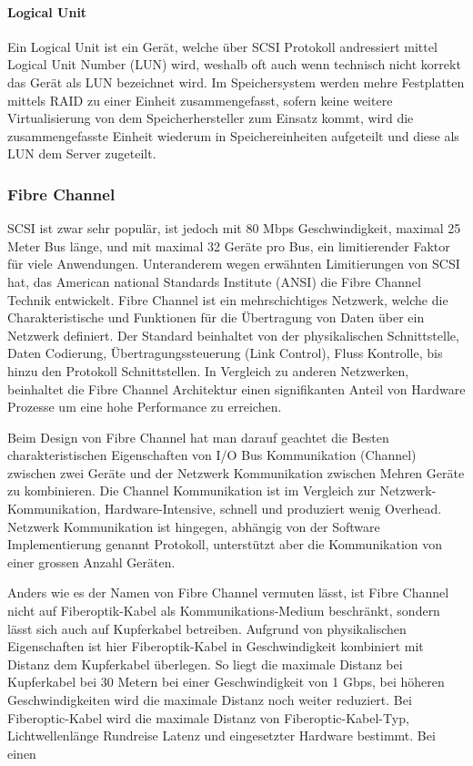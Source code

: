 \paragraph*{Logical Unit}
Ein Logical Unit ist ein Gerät, welche über SCSI Protokoll andressiert mittel Logical Unit Number (LUN) wird, weshalb oft auch wenn technisch nicht korrekt das Gerät als LUN bezeichnet wird. Im Speichersystem werden mehre Festplatten mittels RAID zu einer Einheit zusammengefasst, sofern keine weitere Virtualisierung von dem Speicherhersteller zum Einsatz kommt, wird die zusammengefasste Einheit wiederum in Speichereinheiten aufgeteilt und diese als LUN dem Server zugeteilt.\cite{SNIA2011}

\subsubsection{Fibre Channel}
SCSI ist zwar sehr populär, ist jedoch mit 80 Mbps Geschwindigkeit, maximal 25 Meter Bus länge, und mit maximal 32 Geräte pro Bus, ein limitierender Faktor für viele Anwendungen. Unteranderem wegen erwähnten Limitierungen von SCSI hat, das American national Standards Institute (ANSI) die Fibre Channel Technik entwickelt. Fibre Channel ist ein mehrschichtiges Netzwerk, welche die Charakteristische und Funktionen für die Übertragung von Daten über ein Netzwerk definiert. Der Standard beinhaltet von der physikalischen Schnittstelle, Daten Codierung, Übertragungssteuerung (Link Control), Fluss Kontrolle, bis hinzu den Protokoll Schnittstellen. In Vergleich zu anderen Netzwerken, beinhaltet die Fibre Channel Architektur einen signifikanten Anteil von Hardware Prozesse um eine hohe Performance zu erreichen.\cite{Gupta2002}\cite{Christopher2009}

Beim Design von Fibre Channel hat man darauf geachtet die Besten charakteristischen Eigenschaften von I/O Bus Kommunikation (Channel) zwischen zwei Geräte und der Netzwerk Kommunikation zwischen Mehren Geräte zu kombinieren. Die Channel Kommunikation ist im Vergleich zur Netzwerk-Kommunikation, Hardware-Intensive, schnell und produziert wenig Overhead. Netzwerk Kommunikation ist hingegen, abhängig von der Software Implementierung genannt Protokoll, unterstützt aber die Kommunikation von einer grossen Anzahl Geräten.

Anders wie es der Namen von Fibre Channel vermuten lässt, ist Fibre Channel nicht auf Fiberoptik-Kabel als Kommunikations-Medium beschränkt, sondern lässt sich auch auf Kupferkabel betreiben. Aufgrund von physikalischen Eigenschaften ist hier Fiberoptik-Kabel in Geschwindigkeit kombiniert mit Distanz dem Kupferkabel überlegen. So liegt die maximale Distanz bei Kupferkabel bei 30 Metern bei einer Geschwindigkeit von 1 Gbps, bei höheren Geschwindigkeiten wird die maximale Distanz noch weiter reduziert. Bei Fiberoptic-Kabel wird die maximale Distanz von Fiberoptic-Kabel-Typ, Lichtwellenlänge Rundreise Latenz und eingesetzter Hardware bestimmt. Bei einen 


